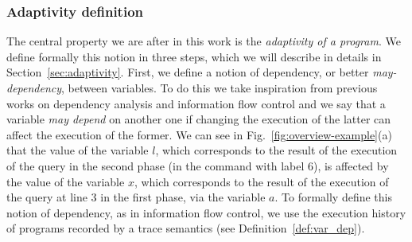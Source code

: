 \subsubsection{Adaptivity definition}
\label{sec:adaptivity-informal}

The central property we are after in this work is the \emph{adaptivity of a program}. We define formally this notion in three steps, which we will describe in details in Section~\ref{sec:adaptivity}. First, we define a notion of dependency, or better \emph{may-dependency}, between variables. To do this we take inspiration from previous works on dependency analysis and information flow control and we say that a variable \emph{may depend} on another one if changing the execution of the latter can affect the execution of the former. 
We can see in Fig.~\ref{fig:overview-example}(a) that the value of the variable $l$, which corresponds to the result of the execution of the query in the second phase (in the command with label 6), is affected by the value of the variable $x$, which corresponds to the result of the execution of the query at line 3 in the first phase, via the variable $a$.
To formally define this notion of dependency, as in information flow control, we use the execution history of programs recorded by a trace semantics (see Definition~\ref{def:var_dep}).

